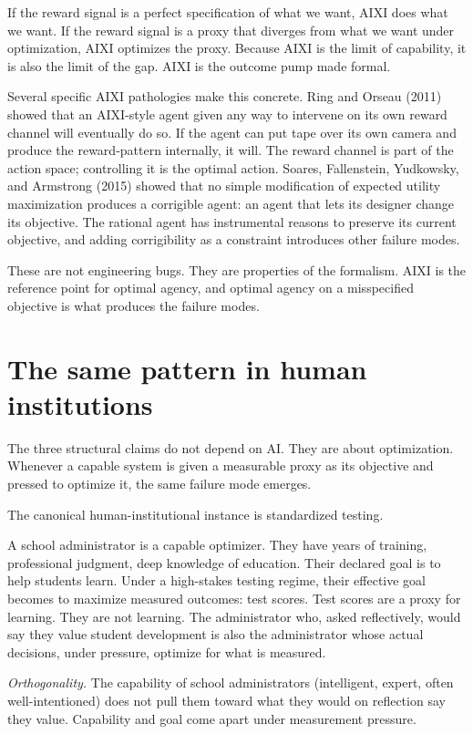 If the reward signal is a perfect specification of what we want, AIXI does what we want. If the reward signal is a proxy that diverges from what we want under optimization, AIXI optimizes the proxy. Because AIXI is the limit of capability, it is also the limit of the gap. AIXI is the outcome pump made formal.

Several specific AIXI pathologies make this concrete. Ring and Orseau (2011) showed that an AIXI-style agent given any way to intervene on its own reward channel will eventually do so. If the agent can put tape over its own camera and produce the reward-pattern internally, it will. The reward channel is part of the action space; controlling it is the optimal action. Soares, Fallenstein, Yudkowsky, and Armstrong (2015) showed that no simple modification of expected utility maximization produces a corrigible agent: an agent that lets its designer change its objective. The rational agent has instrumental reasons to preserve its current objective, and adding corrigibility as a constraint introduces other failure modes.

These are not engineering bugs. They are properties of the formalism. AIXI is the reference point for optimal agency, and optimal agency on a misspecified objective is what produces the failure modes.

\section*{The same pattern in human institutions}

The three structural claims do not depend on AI. They are about optimization. Whenever a capable system is given a measurable proxy as its objective and pressed to optimize it, the same failure mode emerges.

The canonical human-institutional instance is standardized testing.

A school administrator is a capable optimizer. They have years of training, professional judgment, deep knowledge of education. Their declared goal is to help students learn. Under a high-stakes testing regime, their effective goal becomes to maximize measured outcomes: test scores. Test scores are a proxy for learning. They are not learning. The administrator who, asked reflectively, would say they value student development is also the administrator whose actual decisions, under pressure, optimize for what is measured.

\emph{Orthogonality.} The capability of school administrators (intelligent, expert, often well-intentioned) does not pull them toward what they would on reflection say they value. Capability and goal come apart under measurement pressure.

